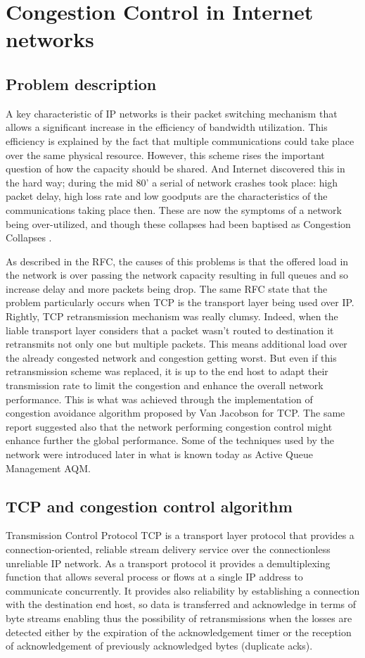 \section{Congestion Control in Internet networks}

\subsection{Problem description}
A key characteristic of IP networks is their packet switching mechanism that allows a significant increase in the efficiency of bandwidth utilization. This efficiency is explained by the fact that multiple communications could take place over the same physical resource. However, this scheme rises the important question of how the capacity should be shared. And Internet discovered this in the hard way; during the mid 80' a serial of network crashes took place: high packet delay, high loss rate and  low  goodputs are the characteristics of the communications taking place then. These are now the symptoms of a network being over-utilized, and though these collapses had been baptised as Congestion Collapses \cite{RFC896}. 

As described in the RFC, the causes of this problems is that the offered load in the network is over passing the network capacity resulting in full queues and so increase delay and more packets being drop. The same RFC state that the problem particularly occurs when TCP is the transport layer being used over IP. Rightly, TCP retransmission mechanism was really clumsy. Indeed, when the liable transport layer considers that a packet wasn't routed to destination it retransmits not only one but multiple packets. This means additional load over the already congested network and congestion getting worst. But even if this retransmission scheme was replaced, it is up to the end host to adapt their transmission rate to limit the congestion and enhance the overall network performance. This is what was achieved through the implementation of congestion avoidance algorithm proposed by Van Jacobson \cite{Jacobson88} for TCP. The same report suggested also that the network performing congestion control might enhance further the global performance. Some of the techniques used by the network were introduced later in what is known today as Active Queue Management AQM.

\subsection{TCP and congestion control algorithm}
Transmission Control Protocol TCP is a transport layer protocol that provides a connection-oriented, reliable stream delivery service over the connectionless unreliable IP network. As a transport protocol it provides a demultiplexing function that allows several process or flows at a single IP address to communicate concurrently. It provides also reliability by establishing a connection with the destination end host, so data is transferred and acknowledge in terms of byte streams enabling thus the possibility of retransmissions when the losses are detected either by the expiration of the acknowledgement timer or the reception of acknowledgement of previously acknowledged bytes (duplicate acks).

